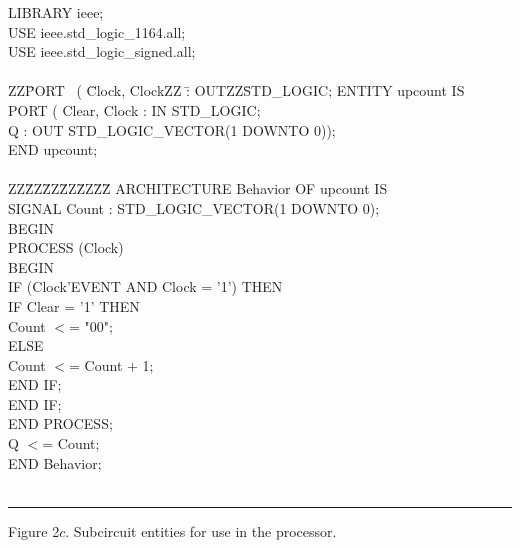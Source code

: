 \documentclass[epsfig,10pt,fullpage]{article}
\begin{document}
\begin{center}
\begin{minipage}[t]{12.5 cm}
\begin{tabbing}
LIBRARY ieee;\\
USE ieee.std\_logic\_1164.all;\\
USE ieee.std\_logic\_signed.all;\\
~\\
ZZ\=PORT ~( \=Clock, ClockZZ \=: OUTZZ\=STD\_LOGIC;\kill
ENTITY upcount IS\\
\>PORT ( \>Clear, Clock \>: IN \>STD\_LOGIC;\\
\>\>Q \>: OUT \>STD\_LOGIC\_VECTOR(1 DOWNTO 0));\\
END upcount;\\
~\\
ZZ\=ZZ\=ZZ\=ZZ\=ZZ\=ZZ\=\kill
ARCHITECTURE Behavior OF upcount IS\\
\>SIGNAL Count : STD\_LOGIC\_VECTOR(1 DOWNTO 0);\\
BEGIN\\
\>PROCESS (Clock)\\
\>BEGIN\\
\>\>IF (Clock'EVENT AND Clock = '1') THEN\\
\>\>\>IF Clear  = '1' THEN\\
\>\>\>\>Count $<$= "00";\\
\>\>\>ELSE \\
\>\>\>\>Count $<$= Count + 1;\\
\>\>\>END IF;\\
\>\>END IF;\\
\>END PROCESS;\\
\>Q $<$= Count;\\
END Behavior;\\
~\rule{5.0in}{0in}
\end{tabbing}
\end{minipage}
\end{center}

\begin{center}
Figure 2$c$. Subcircuit entities for use in the processor.
\end{center}
\end{document}
